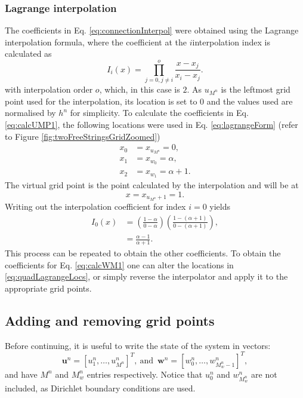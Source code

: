 \subsubsection{Lagrange interpolation}
The coefficients in Eq. \eqref{eq:connectionInterpol} were obtained using the Lagrange interpolation formula, where the coefficient at the $i$\th interpolation index is calculated as
\begin{equation}\label{eq:lagrangeForm}
    I_i(x) = \prod_{j = 0, j\neq i}^o \frac{x-x_j}{x_i-x_j}.
\end{equation}
with interpolation order $o$, which, in this case is $2$. As $u_{M^n}$ is the leftmost grid point used for the interpolation, its location is set to $0$ and the values used are normalised by $h^n$ for simplicity. To calculate the coefficients in Eq. \eqref{eq:calcUMP1}, the following locations were used in Eq. \eqref{eq:lagrangeForm} (refer to Figure \ref{fig:twoFreeStringsGridZoomed})
\begin{equation}\label{eq:quadLagrangeLocs}
    \begin{aligned}
     x_0 &= x_{u_{M^n}} = 0, \\
     x_1 &= x_{w_0} = \alpha, \\
     x_2& = x_{w_1} = \alpha + 1.
    \end{aligned}
\end{equation}
The virtual grid point is the point calculated by the interpolation and will be at
\begin{equation}
    x = x_{u_{M^n}+1} = 1.
\end{equation}
Writing out the interpolation coefficient for index $i=0$ yields
\begin{align*}
    I_0(x)&= \left(\frac{1-\alpha}{0-\alpha}\right)\left(\frac{1-(\alpha+1)}{0-(\alpha+1)}\right), \\
    &=\frac{\alpha-1}{\alpha+1}.
\end{align*}
This process can be repeated to obtain the other coefficients. To obtain the coefficients for Eq. \eqref{eq:calcWM1} one can alter the locations in \eqref{eq:quadLagrangeLocs}, or simply reverse the interpolator and apply it to the appropriate grid points. 


\subsection{Adding and removing grid points}
Before continuing, it is useful to write the state of the system in vectors:
\begin{equation}
    \label{eq:separateStateVectors}
     \mathbf{u}^n = [u_1^n, \hdots, u_{M^n}^n]^T\!, \  \text{and} \ \; \mathbf{w}^n = [w_0^n, \hdots, w_{M_w^n-1}^n]^T,
\end{equation}
and have $M^n$ and $M_w^n$ entries respectively. Notice that $u_0^n$ and $w_{M_w^n}^n$ are not included, as Dirichlet boundary conditions are used.


